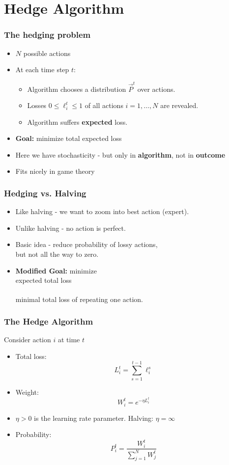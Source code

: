 \documentclass[handout]{beamer}
\begin{document}
\section{Hedge Algorithm}

\begin{frame}
\frametitle{The hedging problem}

\begin{itemize}
\item $N$ possible actions 

\item At each time step $t$:
\begin{itemize}
\item Algorithm chooses a distribution $\vec{P}^t$ over actions.
\item Losses $0 \leq \ell_i^t \leq 1$ of all actions $i=1,\ldots,N$ are revealed.
\item Algorithm suffers {\bf expected} loss.
\end{itemize}
\item {{\bf Goal:} minimize total expected loss}
\item {Here we have stochasticity - but only in {\bf algorithm}, not in {\bf outcome}}
\item {Fits nicely in game theory}
\end{itemize}
\end{frame}

\begin{frame}
\frametitle{Hedging vs. Halving}
\begin{itemize}
\item Like halving - we want to zoom into best action (expert).
\item Unlike halving - no action is perfect.
\item Basic idea - reduce probability of lossy actions, \\
but {\color{red}not all the way to zero}.
\item {\bf Modified Goal:}
minimize {\color{red}{difference between}} \\
expected total loss \\
{\color{red}{and}} \\
minimal total loss of repeating one action.
\end{itemize}
\end{frame}

\begin{frame}
\frametitle{The Hedge Algorithm}
Consider action $i$ at time $t$
\begin{itemize}
\item Total loss:
$$L_i^t = \sum_{s=1}^{t-1} \ell_i^s$$
\item Weight:
$$W_i^t = e^{-\eta L_i^t}$$
\item
$\eta>0$ is the learning rate parameter. Halving: $\eta=\infty$ 
\item Probability:
$$P_i^t = \frac{W_i^t}{\sum_{j=1}^N W_j^t} $$
\end{itemize}
\end{frame}
\end{document}
